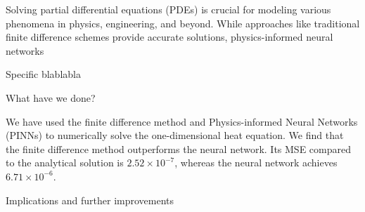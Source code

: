 Solving partial differential equations (PDEs) is crucial for modeling various phenomena in physics, engineering, and beyond.
While approaches like traditional finite difference schemes provide accurate solutions, physics-informed neural networks

Specific blablabla

What have we done?

We have used the finite difference method and Physics-informed Neural Networks (PINNs) to numerically solve the one-dimensional heat equation. 
We find that the finite difference method outperforms the neural network. 
Its MSE compared to the analytical solution is $2.52 \times 10^{-7}$, whereas the neural network achieves $ 6.71 \times 10^{-6}$. 

Implications and further improvements

